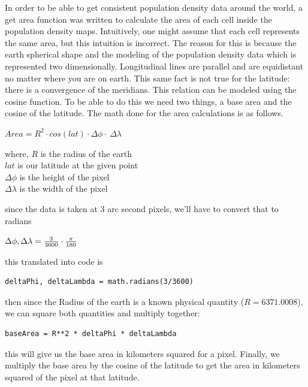 \documentclass{article}
\begin{document}
In order to be able to get consistent population density data around the world, a get area function was written to calculate the area of each cell inside the population density maps. Intuitively, one might assume that each cell represents the same area, but this intuition is incorrect. The reason for this is because the earth spherical shape and the modeling of the population density data which is represented two dimensionally. Longitudinal lines are parallel and are equidistant no matter where you are on earth. This same fact is not true for the latitude: there is a convergence of the meridians. This relation can be modeled using the cosine function. To be able to do this we need two things, a base area and the cosine of the latitude. The math done for the area calculations is as follows.

\begin{center}
$Area = R^2 \cdot cos(lat) \cdot \Delta\phi \cdot\ \Delta\lambda$

where, $R$ is the radius of the earth\\
$lat$ is our latitude at the given point\\
$\Delta\phi$ is the height of the pixel\\
$\Delta\lambda$ is the width of the pixel\\
  
\end{center}

since the data is taken at 3 arc second pixels, we'll have to convert that to radians

\begin{center}
$\Delta\phi, \space \Delta\lambda = \frac{3}{3600} \cdot \frac{\pi}{180}$
\end{center}

this translated into code is

\begin{verbatim}
deltaPhi, deltaLambda = math.radians(3/3600)
\end{verbatim}

then since the Radius of the earth is a known physical quantity ($R = 6371.0008$), we can square both quantities and multiply together:

\begin{verbatim}
baseArea = R**2 * deltaPhi * deltaLambda
\end{verbatim}

this will give us the base area in kilometers squared for a pixel. Finally, we multiply the base area by the cosine of the latitude to get the area in kilometers squared of the pixel at that latitude.
\end{document}
